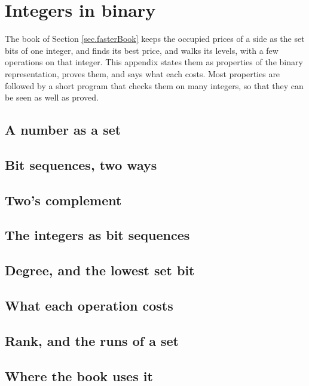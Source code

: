 \chapter{Integers in binary}
\label{chap.integersInBinary}

The book of Section \ref{sec.fasterBook}
keeps the occupied prices of a side as the set bits of one integer,
and finds its best price, and walks its levels, with a few operations on that integer.
This appendix states them as properties of the binary representation, proves them,
and says what each costs.
Most properties are followed by a short program that checks them on many integers,
so that they can be seen as well as proved.

\section{A number as a set}
\label{sec.numberAsSet}


\section{Bit sequences, two ways}
\label{sec.bitSequences}


\section{Two's complement}
\label{sec.twosComplement}


\section{The integers as bit sequences}
\label{sec.integersAsSequences}


\section{Degree, and the lowest set bit}
\label{sec.binaryDegree}


\section{What each operation costs}
\label{sec.binaryCosts}


\section{Rank, and the runs of a set}
\label{sec.binaryRuns}


\section{Where the book uses it}
\label{sec.binaryInTheBook}

